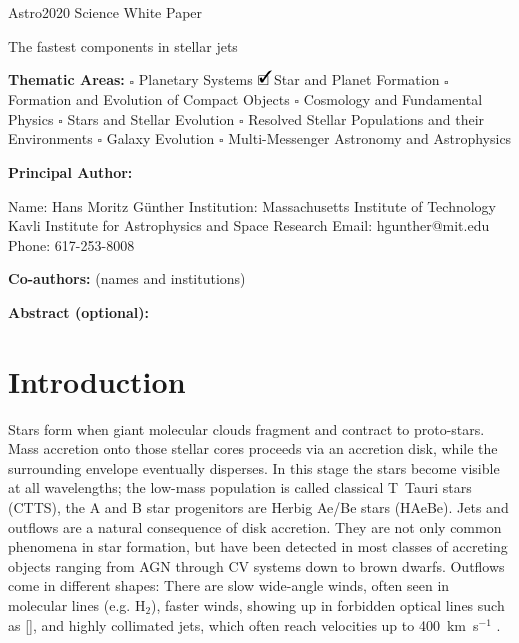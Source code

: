 \documentclass[12pt]{article}
\newcommand{\cmark}{\ding{51}}%
\newcommand{\done}{\rlap{$\square$}{\raisebox{2pt}{\large\hspace{1pt}\cmark}}%
\hspace{-2.5pt}}
\begin{document}
\raggedright
\huge
Astro2020 Science White Paper \linebreak

The fastest components in stellar jets \linebreak
\normalsize

\noindent \textbf{Thematic Areas:} \hspace*{60pt} $\square$ Planetary Systems \hspace*{10pt} $\done$ Star and Planet Formation \hspace*{20pt}\linebreak
$\square$ Formation and Evolution of Compact Objects \hspace*{31pt} $\square$ Cosmology and Fundamental Physics \linebreak
  $\square$  Stars and Stellar Evolution \hspace*{1pt} $\square$ Resolved Stellar Populations and their Environments \hspace*{40pt} \linebreak
  $\square$    Galaxy Evolution   \hspace*{45pt} $\square$             Multi-Messenger Astronomy and Astrophysics \hspace*{65pt} \linebreak
  
\textbf{Principal Author:}

Name:	Hans Moritz G\"unther
 \linebreak						
Institution: Massachusetts Institute of Technology
Kavli Institute for Astrophysics and Space Research 
 \linebreak
Email: hgunther@mit.edu
 \linebreak
Phone:  617-253-8008
 \linebreak
 
\textbf{Co-authors:} (names and institutions)
  \linebreak

\textbf{Abstract  (optional):}


\pagebreak
\section{Introduction}
Stars form when giant molecular clouds fragment and contract to proto-stars. Mass accretion onto those stellar cores proceeds via an accretion disk, while the surrounding envelope eventually disperses. In this stage the stars become visible at all wavelengths; the low-mass population is called classical T~Tauri stars (CTTS), the A and B star progenitors are Herbig Ae/Be stars (HAeBe). Jets and outflows are a natural consequence of disk accretion. They are not only common phenomena in star formation, but have been detected in most classes of accreting objects ranging from AGN through CV systems down to brown dwarfs. Outflows come in different shapes: There are slow wide-angle winds, often seen in molecular lines (e.g. H$_2$), faster winds, showing up in forbidden optical lines such as [], and highly collimated jets, which often reach velocities up to 400~km~s$^{-1}$ \citep{1998AJ....115.1554E}.
\end{document}
